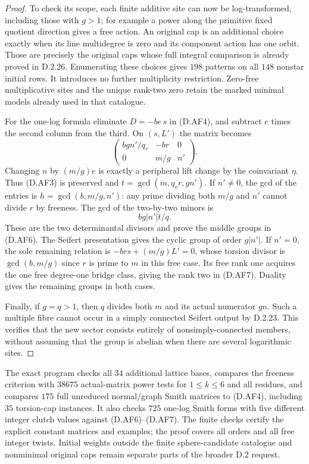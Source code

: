 \begin{proof}
To check its scope, each finite additive site can now be
log-transformed, including those with $g>1$; for example a
power along the primitive fixed quotient direction gives a
free action. An original cap is an additional choice exactly
when its line multidegree is zero and its component action
has one orbit. Those are precisely the original caps whose
full integral comparison is already proved in D.2.26.
Enumerating these choices gives $198$ patterns on all $148$
nonstar initial rows. It introduces no further multiplicity
restriction. Zero-free multiplicative sites and the unique
rank-two zero retain the marked minimal models already used
in that catalogue.

For the one-log formula eliminate $D=-be\,s$ in (D.AF4),
and subtract $e$ times the second column from the third.
On $(s,L')$ the matrix becomes
\[
 \begin{pmatrix}
  bgn'/q_v&-br&0\\
  0&m/g&n'
 \end{pmatrix}.                                            \tag{D.AF9}
\]
Changing $n$ by $(m/g)e$ is exactly a peripheral lift change
by the coinvariant $\eta$. Thus (D.AF3) is preserved and
$t=\gcd(m,q_vr,gn')$. If $n'\ne0$, the gcd of the entries is
$h=\gcd(b,m/g,n')$: any prime dividing both $m/g$ and $n'$
cannot divide $r$ by freeness. The gcd of the two-by-two
minors is
\[
 bg|n'|t/q.
\]
These are the two determinantal divisors and prove the
middle groups in (D.AF6). The Seifert presentation gives the
cyclic group of order $g|n'|$. If $n'=0$, the sole remaining
relation is $-brs+(m/g)L'=0$, whose torsion divisor is
$\gcd(b,m/g)$ since $r$ is prime to $m$ in this free case.
Its free rank one acquires the one free degree-one bridge
class, giving the rank two in (D.AF7). Duality gives the
remaining groups in both cases.

Finally, if $g=q>1$, then $q$ divides both $m$ and its actual
numerator $gn$. Such a multiple fibre cannot occur in a
simply connected Seifert output by D.2.23. This verifies
that the new sector consists entirely of nonsimply-connected
members, without assuming that the group is abelian when
there are several logarithmic sites.
\end{proof}

The exact program 
checks all $34$ additional lattice bases, compares the
freeness criterion with $38675$ actual-matrix power tests
for $1\le k\le6$ and all residues, and compares $175$ full
unreduced normal/graph Smith matrices to (D.AF4), including
$35$ torsion-cap instances. It also checks $725$ one-log
Smith forms with five different integer clutch values against
(D.AF6)--(D.AF7). The finite checks certify the explicit
constant matrices and examples; the proof covers all orders
and all free integer twists. Initial weights outside the
finite sphere-candidate catalogue and nonminimal original
caps remain separate parts of the broader D.2 request.
